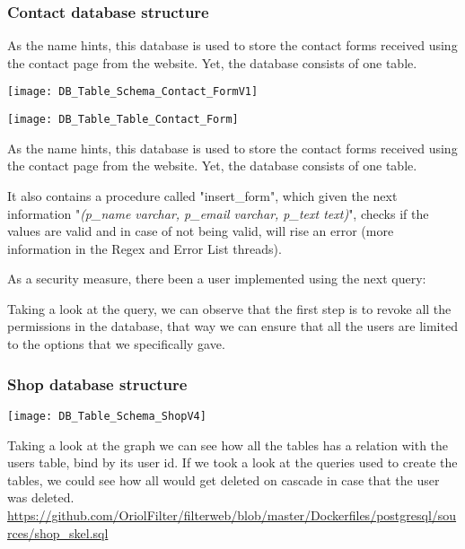 \subsubsection[Contact database structure]{Contact database structure}
\begin{flushleft}
    As the name hints, this database is used to store the contact forms received using the contact page from the website.
    Yet, the database consists of one table.
\end{flushleft}

\begin{center}
    \texttt{[image: DB\_Table\_Schema\_Contact\_FormV1]}
\end{center}
\begin{center}
    \texttt{[image: DB\_Table\_Table\_Contact\_Form]}
\end{center}

\begin{flushleft}
    As the name hints, this database is used to store the contact forms received using the contact page from the website.
    Yet, the database consists of one table.
\end{flushleft}
\begin{flushleft}
    It also contains a procedure called "insert\_form", which given the next information "\textit{(p\_name varchar,
    p\_email varchar, p\_text text)}", checks if the values are valid and in case of not being valid, will rise an error
    (more information in the Regex and Error List threads).
\end{flushleft}
\begin{flushleft}
    As a security measure, there been a user implemented using the next query:
    
\end{flushleft}
\begin{flushleft}
    Taking a look at the query, we can observe that the first step is to revoke all the permissions in the database,
    that way we can ensure that all the users are limited to the options that we specifically gave.
\end{flushleft}


\newpage
\subsubsection[Shop database structure]{Shop database structure}
\begin{center}
    \texttt{[image: DB\_Table\_Schema\_ShopV4]}
\end{center}
\begin{flushleft}
    Taking a look at the graph we can see how all the tables has a relation with the users table, bind by its user id.
    If we took a look at the queries used to create the tables, we could see how all would get deleted on cascade in case
    that the user was deleted.
    \url{https://github.com/OriolFilter/filterweb/blob/master/Dockerfiles/postgresql/sources/shop_skel.sql}
\end{flushleft}


